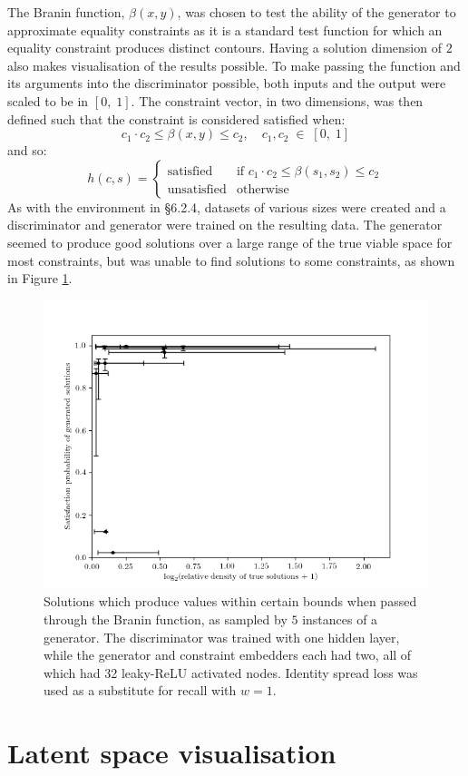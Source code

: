 \documentclass[../../main.tex]{subfiles}
\begin{document}
The Branin function, $\beta(x,y)$, was chosen to test the ability of the generator to approximate equality constraints as it is a standard test function for which an equality constraint produces distinct contours.
Having a solution dimension of $2$ also makes visualisation of the results possible.
To make passing the function and its arguments into the discriminator possible, both inputs and the output were scaled to be in $[0,\;1]$.
The constraint vector, in two dimensions, was then defined such that the constraint is considered satisfied when:
$$c_1\cdot c_2\le\beta(x,y)\le c_2,\quad c_1,c_2\;\in\;[0,\;1]$$
and so:
$$h(c,s)=\left\{\begin{array}{ll}\text{satisfied}&\mbox{if }c_1\cdot c_2\le\beta(s_1,s_2)\le c_2\\\text{unsatisfied}&\mbox{otherwise}\end{array}\right.$$
As with the environment in \S6.2.4, datasets of various sizes were created and a discriminator and generator were trained on the resulting data.
The generator seemed to produce good solutions over a large range of the true viable space for most constraints, but was unable to find solutions to some constraints, as shown in Figure \ref{fig:braninPropertiesW1}.
\begin{figure}[H]
    \begin{center}
    \includegraphics[width=\textwidth]{braninPropertiesW1}
    \caption{
        Solutions which produce values within certain bounds when passed through the Branin function, as sampled by $5$ instances of a generator.
        The discriminator was trained with one hidden layer, while the generator and constraint embedders each had two, all of which had 32 leaky-ReLU activated nodes.
        Identity spread loss was used as a substitute for recall with $w=1$.
    }
    \label{fig:braninPropertiesW1}
    \end{center}
\end{figure}

\section{Latent space visualisation}
\end{document}
